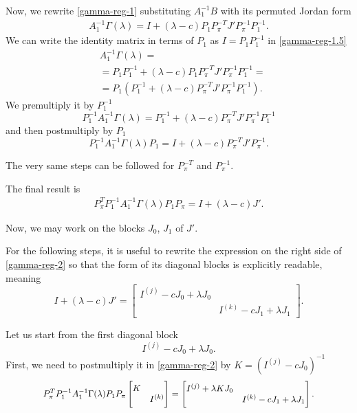 Now, we rewrite \eqref{gamma-reg-1} substituting \(A_{1}^{-1}B\) with its permuted Jordan form
\begin{gather}
    A_{1}^{-1} \Gamma(\lambda) = I + (\lambda - c)P_{1} P_{\pi}^{-T} J' P_{\pi}^{-1} P_{1}^{-1}.
    \label{gamma-reg-1.5}
\end{gather}
We can write the identity matrix in terms of \(P_{1}\) as \(I = P_{1}P_{1}^{-1}\) in \eqref{gamma-reg-1.5}
\begin{align*}
    & A_{1}^{-1} \Gamma(\lambda) = \\
    &= P_{1}P_{1}^{-1} + (\lambda - c)P_{1} P_{\pi}^{-T} J' P_{\pi}^{-1} P_{1}^{-1} = \\
    &= P_{1}(P_{1}^{-1} + (\lambda - c)P_{\pi}^{-T} J' P_{\pi}^{-1} P_{1}^{-1}).
\end{align*}
We premultiply it by \(P_{1}^{-1}\)
\[
    P_{1}^{-1} A_{1}^{-1} \Gamma(\lambda) = P_{1}^{-1} + (\lambda - c)P_{\pi}^{-T} J' P_{\pi}^{-1} P_{1}^{-1}
\]
and then postmultiply by \(P_{1}\)
\[
    P_{1}^{-1} A_{1}^{-1} \Gamma(\lambda) P_{1} = I + (\lambda - c)P_{\pi}^{-T} J' P_{\pi}^{-1}.
\]

The very same steps can be followed for \(P_{\pi}^{-T}\) and \(P_{\pi}^{-1}\).

The final result is
\begin{gather}
    P_{\pi}^T P_{1}^{-1} A_{1}^{-1} \Gamma(\lambda) P_{1} P_{\pi} = I + (\lambda - c)J'. \label{gamma-reg-2}
\end{gather}

Now, we may work on the blocks \(J_{0}\), \(J_{1}\) of \(J'\).

For the following steps, it is useful to rewrite the expression on the right side of \eqref{gamma-reg-2} so that
the form of its diagonal blocks is explicitly readable, meaning
\[
    I + (\lambda - c)J' =
    \begin{bmatrix}
        I^{(j)} - cJ_{0} + \lambda J_{0} & \\
        & I^{(k)} - cJ_{1} + \lambda J_{1}
    \end{bmatrix}.
\]

Let us start from the first diagonal block
\[
    I^{(j)} - cJ_{0} + \lambda J_{0}.
\]
First, we need to postmultiply it in
\eqref{gamma-reg-2} by \(K = (I^{(j)} - cJ_{0})^{-1}\)
\begin{gather*}
    \scalemath{0.92}{
        P_{\pi}^T P_{1}^{-1} A_{1}^{-1} \Gamma(\lambda) P_{1} P_{\pi}
        \begin{bmatrix}
            K& \\
            & I^{(k)}
        \end{bmatrix}
        = 
        \begin{bmatrix}
            I^{(j)} + \lambda K J_{0} & \\
            & I^{(k)} - cJ_{1} + \lambda J_{1}
        \end{bmatrix}.
    }
\end{gather*}

